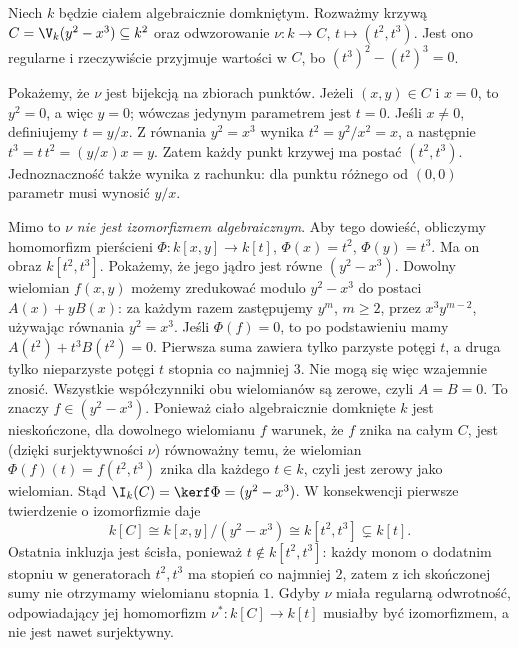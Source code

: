 \begin{przyklad}
\label{pr:cusp}
Niech $k$ będzie ciałem algebraicznie domkniętym.
Rozważmy krzywą
$C=\V_k(y^2-x^3)\subseteq k^2$ oraz odwzorowanie
$\nu:k\to C$, $t\mapsto(t^2,t^3)$.
Jest ono regularne i rzeczywiście przyjmuje wartości w $C$,
bo $(t^3)^2-(t^2)^3=0$.

Pokażemy, że $\nu$ jest bijekcją na zbiorach punktów.
Jeżeli $(x,y)\in C$ i $x=0$, to $y^2=0$, a więc $y=0$;
wówczas jedynym parametrem jest $t=0$.
Jeśli $x\ne0$, definiujemy $t=y/x$. Z równania $y^2=x^3$
wynika $t^2=y^2/x^2=x$, a następnie
$t^3=t\,t^2=(y/x)x=y$. Zatem każdy punkt krzywej ma postać
$(t^2,t^3)$. Jednoznaczność także wynika z rachunku:
dla punktu różnego od $(0,0)$ parametr musi wynosić $y/x$.

Mimo to $\nu$ \emph{nie jest izomorfizmem algebraicznym}.
Aby tego dowieść, obliczymy homomorfizm pierścieni
$\Phi:k[x,y]\to k[t]$, $\Phi(x)=t^2$, $\Phi(y)=t^3$.
Ma on obraz $k[t^2,t^3]$.
Pokażemy, że jego jądro jest równe $(y^2-x^3)$.
Dowolny wielomian $f(x,y)$ możemy zredukować modulo
$y^2-x^3$ do postaci $A(x)+yB(x)$:
za każdym razem zastępujemy $y^m$, $m\ge2$, przez
$x^3y^{m-2}$, używając równania $y^2=x^3$.
Jeśli $\Phi(f)=0$, to po podstawieniu mamy
$A(t^2)+t^3B(t^2)=0$.
Pierwsza suma zawiera tylko parzyste potęgi $t$,
a druga tylko nieparzyste potęgi $t$ stopnia co najmniej $3$.
Nie mogą się więc wzajemnie znosić. Wszystkie współczynniki
obu wielomianów są zerowe, czyli $A=B=0$.
To znaczy $f\in(y^2-x^3)$.
Ponieważ ciało algebraicznie domknięte $k$ jest nieskończone,
dla dowolnego wielomianu $f$ warunek, że $f$ znika na
całym $C$, jest (dzięki surjektywności $\nu$) równoważny temu,
że wielomian $\Phi(f)(t)=f(t^2,t^3)$ znika dla każdego
$t\in k$, czyli jest zerowy jako wielomian.
Stąd $\I_k(C)=\kerf\Phi=(y^2-x^3)$.
W konsekwencji pierwsze twierdzenie o izomorfizmie daje
\[
k[C]\cong k[x,y]/(y^2-x^3)\cong k[t^2,t^3]\subsetneq k[t].
\]
Ostatnia inkluzja jest ścisła, ponieważ $t\notin k[t^2,t^3]$:
każdy monom o dodatnim stopniu w generatorach $t^2,t^3$
ma stopień co najmniej $2$, zatem z ich skończonej sumy
nie otrzymamy wielomianu stopnia $1$.
Gdyby $\nu$ miała regularną odwrotność, odpowiadający jej
homomorfizm $\nu^*:k[C]\to k[t]$ musiałby być izomorfizmem,
a nie jest nawet surjektywny.
\end{przyklad}

